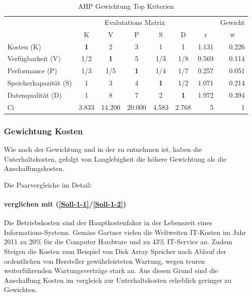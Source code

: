 \begin{table}[htbp]
\caption{AHP Gewichtung Top Kriterien}
\begin{tabular}{|l|c|c|c|c|c|r|r|}
\hline
\multicolumn{ 1}{|c|}{} & \multicolumn{ 5}{c|}{Evalutations Matrix} & \multicolumn{1}{l|}{} & \multicolumn{1}{l|}{Gewicht} \\ \cline{ 2- 8}
\multicolumn{ 1}{|c|}{} & K & V & P & S & D & \multicolumn{1}{c|}{r} & \multicolumn{1}{c|}{w} \\ \hline
Kosten (K) & \textbf{1} & 2 & 3 & 1 & 1 & 1.131 & 0.226 \\ \hline
Verfügbarkeit (V) &  1/2 & \textbf{1} & 5 &  1/3 &  1/8 & 0.569 & 0.114 \\ \hline
Performance (P) &  1/3 &  1/5 & \textbf{1} &  1/4 &  1/7 & 0.257 & 0.051 \\ \hline
Speicherkapazität (S) & 1 & 3 & 4 & \textbf{1} &  1/2 & 1.071 & 0.214 \\ \hline
Datenqualität (D) & 1 & 8 & 7 & 2 & \textbf{1} & 1.972 & 0.394 \\ \hline  \hline
Ci & \multicolumn{1}{r|}{3.833} & \multicolumn{1}{r|}{14.200} & \multicolumn{1}{r|}{20.000} & \multicolumn{1}{r|}{4.583} & \multicolumn{1}{r|}{2.768} & 5 & 1 \\ \hline 
\end{tabular}
\label{AHPTop}
\end{table}

\subsubsection{Gewichtung Kosten}

Wie nach der Gewichtung und in der  zu entnehmen ist, haben die Unterhaltskosten, gefolgt von Langlebigkeit die höhere Gewichtung als die Anschaffungskosten.

Die Paarvergleiche im Detail:

\paragraph*{ verglichen mit  (\ref{Soll-1-1}/\ref{Soll-1-2})}
Die Betriebskosten sind der Hauptkostenfakor in der Lebenszeit eines Informations-Systems. Gemäss Gartner vielen die Weltweiten IT-Kosten im Jahr 2011 zu 20\% für die Computer Hardware und zu 43\% IT-Service an. Zudem Steigen die Kosten zum Beispiel von Disk Array Speicher nach Ablauf der ordentlichen von Hersteller gewährleisteten Wartung, wegen teuren weiterführenden Wartungsverträge stark an.
Aus diesen Grund sind die Anschaffung Kosten im vergleich zur Unterhaltskosten erheblich geringer zu Gewichten.

